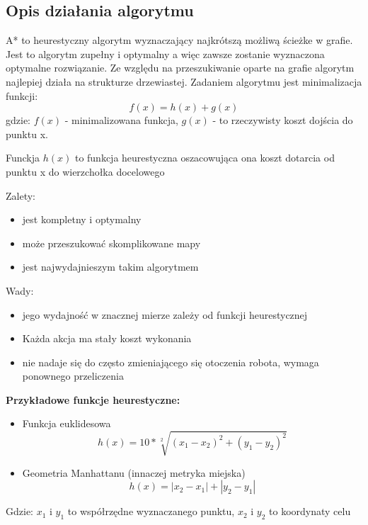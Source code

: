 \subsection{Opis działania algorytmu}

A* to heurestyczny algorytm wyznaczający najkrótszą możliwą ścieżke w grafie. 
Jest to algorytm zupełny i optymalny a więc zawsze zostanie wyznaczona optymalne 
rozwiązanie. Ze względu na przeszukiwanie oparte na grafie algorytm najlepiej działa na strukturze drzewiastej.
Zadaniem algorytmu jest minimalizacja funkcji:
\begin{equation}
	f(x)=h(x) + g(x)
	\label{Eq:funkcjaKosztuAStar}
\end{equation}
gdzie: $f(x)$ - minimalizowana funkcja, $g(x)$ - to rzeczywisty koszt dojścia do punktu x.

Funckja $h(x)$ to funkcja heurestyczna oszacowująca ona koszt dotarcia od punktu x do wierzchołka docelowego

Zalety:
\begin{itemize}
    \item jest kompletny i optymalny
    \item może przeszukować skomplikowane mapy
    \item jest najwydajnieszym takim algorytmem
\end{itemize}
Wady:
\begin{itemize}
    \item jego wydajność w znacznej mierze zależy od funkcji heurestycznej
    \item Każda akcja ma stały koszt wykonania
    \item nie nadaje się do często zmieniającego się otoczenia robota, wymaga ponownego przeliczenia
    
\end{itemize}


\textbf{Przykładowe funkcje heurestyczne:}
\begin{itemize}
    \item Funkcja euklidesowa
    \begin{equation}
        h(x)= 10 * \sqrt[2]{(x_1 - x_2)^2 + (y_1 - y_2)^2}
        \label{Eq:heuresticEucalides}
    \end{equation}
    \item Geometria Manhattanu (innaczej metryka miejska)
    \begin{equation}
        h(x)= |x_2 - x_1| + |y_2 - y_1|
        \label{Eq:heuresticManhattanu}
    \end{equation}
\end{itemize}
Gdzie: $x_1$ i $y_1$ to współrzędne wyznaczanego punktu, $x_2$ i $y_2$ to koordynaty celu